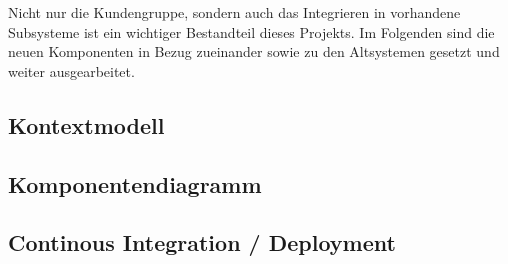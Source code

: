 Nicht nur die Kundengruppe, sondern auch das Integrieren in vorhandene Subsysteme ist ein wichtiger Bestandteil dieses Projekts. Im Folgenden sind die neuen Komponenten in Bezug zueinander sowie zu den Altsystemen gesetzt und weiter ausgearbeitet.

\subsection{Kontextmodell}\label{subsec:kontextmodell}
    

\subsection{Komponentendiagramm}\label{subsec:komponentendiagramm}
    

\subsection{Continous Integration / Deployment}\label{subsec:continous-integration-and-deployment}
    